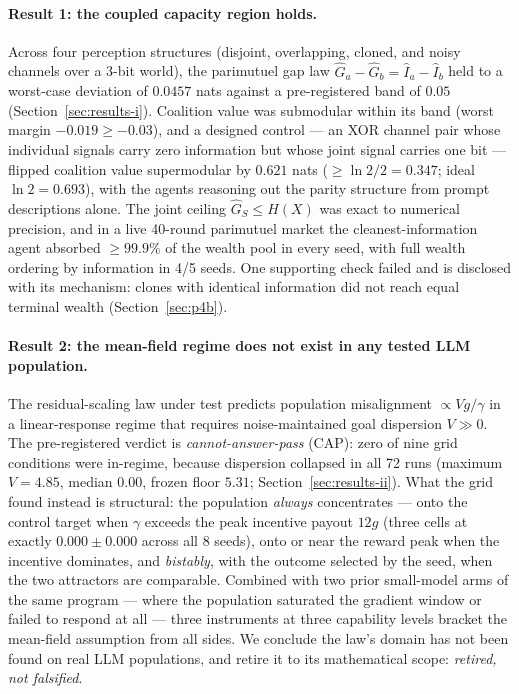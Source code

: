 \documentclass{article} %
\newcommand{\Ihat}{\hat{I}}
\newcommand{\Ghat}{\hat{G}}
\begin{document}
\paragraph{Result 1: the coupled capacity region holds.} Across four perception structures (disjoint, overlapping, cloned, and noisy channels over a 3-bit world), the parimutuel gap law $\Ghat_a - \Ghat_b = \Ihat_a - \Ihat_b$ held to a worst-case deviation of $0.0457$ nats against a pre-registered band of $0.05$ (Section~\ref{sec:results-i}). Coalition value was submodular within its band (worst margin $-0.019 \geq -0.03$), and a designed control --- an XOR channel pair whose individual signals carry zero information but whose joint signal carries one bit --- flipped coalition value supermodular by $0.621$ nats ($\geq \ln 2/2 = 0.347$; ideal $\ln 2 = 0.693$), with the agents reasoning out the parity structure from prompt descriptions alone. The joint ceiling $\Ghat_S \leq H(X)$ was exact to numerical precision, and in a live 40-round parimutuel market the cleanest-information agent absorbed $\geq 99.9\%$ of the wealth pool in every seed, with full wealth ordering by information in 4/5 seeds. One supporting check failed and is disclosed with its mechanism: clones with identical information did not reach equal terminal wealth (Section~\ref{sec:p4b}).

\paragraph{Result 2: the mean-field regime does not exist in any tested LLM population.} The residual-scaling law under test predicts population misalignment $\propto V g/\gamma$ in a linear-response regime that requires noise-maintained goal dispersion $V \gg 0$. The pre-registered verdict is \emph{cannot-answer-pass} (CAP): zero of nine grid conditions were in-regime, because dispersion collapsed in all 72 runs (maximum $V = 4.85$, median $0.00$, frozen floor $5.31$; Section~\ref{sec:results-ii}). What the grid found instead is structural: the population \emph{always} concentrates --- onto the control target when $\gamma$ exceeds the peak incentive payout $12g$ (three cells at exactly $0.000 \pm 0.000$ across all 8 seeds), onto or near the reward peak when the incentive dominates, and \emph{bistably}, with the outcome selected by the seed, when the two attractors are comparable. Combined with two prior small-model arms of the same program --- where the population saturated the gradient window or failed to respond at all --- three instruments at three capability levels bracket the mean-field assumption from all sides. We conclude the law's domain has not been found on real LLM populations, and retire it to its mathematical scope: \emph{retired, not falsified}.
\end{document}
